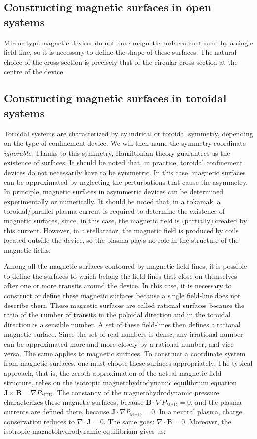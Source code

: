 \subsection{Constructing magnetic surfaces in open systems}

Mirror-type magnetic devices do not have magnetic surfaces contoured by a single field-line, so it is necessary to define the shape of these surfaces. The natural choice of the cross-section is precisely that of the circular cross-section at the centre of the device.

\subsection{Constructing magnetic surfaces in toroidal systems}

Toroidal systems are characterized by cylindrical or toroidal symmetry, depending on the type of confinement device. We will then name the symmetry coordinate \textit{ignorable}. Thanks to this symmetry, Hamiltonian theory guarantees us the existence of surfaces. It should be noted that, in practice, toroidal confinement devices do not necessarily have to be symmetric. In this case, magnetic surfaces can be approximated by neglecting the perturbations that cause the asymmetry. In principle, magnetic surfaces in asymmetric devices can be determined experimentally or numerically. It should be noted that, in a tokamak, a toroidal/parallel plasma current is required to determine the existence of magnetic surfaces, since, in this case, the magnetic field is (partially) created by this current. However, in a stellarator, the magnetic field is produced by coils located outside the device, so the plasma plays no role in the structure of the magnetic fields.

\quad Among all the magnetic surfaces contoured by magnetic field-lines, it is possible to define the surfaces to which belong the field-lines that close on themselves after one or more transits around the device. In this case, it is necessary to construct or define these magnetic surfaces because a single field-line does not describe them. These magnetic surfaces are called rational surfaces because the ratio of the number of transits in the poloidal direction and in the toroidal direction is a sensible number. A set of these field-lines then defines a rational magnetic surface. Since the set of real numbers is dense, any irrational number can be approximated more and more closely by a rational number, and vice versa. The same applies to magnetic surfaces. To construct a coordinate system from magnetic surfaces, one must choose these surfaces appropriately. The typical approach, that is, the zeroth approximation of the actual magnetic field structure, relies on the isotropic magnetohydrodynamic equilibrium equation $\mathbf{J}\times\mathbf{B}=\nabla P_\text{MHD}$. The constancy of the magnetohydrodynamic pressure characterizes these magnetic surfaces, because $\mathbf{B}\cdot\nabla P_\text{MHD}=0$, and the plasma currents are defined there, because $\mathbf{J}\cdot\nabla P_\text{MHD}=0$. In a neutral plasma, charge conservation reduces to $\nabla\cdot\mathbf{J}=0$. The same goes: $\nabla\cdot\mathbf{B}=0$. Moreover, the isotropic magnetohydrodynamic equilibrium gives us:

